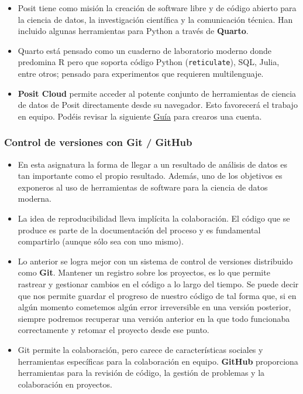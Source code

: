 \documentclass[
  letterpaper,
  DIV=11,
  numbers=noendperiod]{scrreprt}
\begin{document}
\begin{itemize}
\item
  Posit tiene como misión la creación de software libre y de código
  abierto para la ciencia de datos, la investigación científica y la
  comunicación técnica. Han incluido algunas herramientas para Python a
  través de \textbf{Quarto}.
\item
  Quarto está pensado como un cuaderno de laboratorio moderno donde
  predomina R pero que soporta código Python (\texttt{reticulate}), SQL,
  Julia, entre otros; pensado para experimentos que requieren
  multilenguaje.
\item
  \textbf{Posit Cloud} permite acceder al potente conjunto de
  herramientas de ciencia de datos de Posit directamente desde su
  navegador. Esto favorecerá el trabajo en equipo. Podéis revisar la
  siguiente \href{https://posit.cloud/learn/guide}{Guía} para crearos
  una cuenta.
\end{itemize}

\hypertarget{control-de-versiones-con-git-github}{%
\subsubsection{Control de versiones con Git /
GitHub}\label{control-de-versiones-con-git-github}}

\begin{itemize}
\item
  En esta asignatura la forma de llegar a un resultado de análisis de
  datos es tan importante como el propio resultado. Además, uno de los
  objetivos es exponeros al uso de herramientas de software para la
  ciencia de datos moderna.
\item
  La idea de reproducibilidad lleva implícita la colaboración. El código
  que se produce es parte de la documentación del proceso y es
  fundamental compartirlo (aunque sólo sea con uno mismo).
\item
  Lo anterior se logra mejor con un sistema de control de versiones
  distribuido como \textbf{Git}. Mantener un registro sobre los
  proyectos, es lo que permite rastrear y gestionar cambios en el código
  a lo largo del tiempo. Se puede decir que nos permite guardar el
  progreso de nuestro código de tal forma que, si en algún momento
  cometemos algún error irreversible en una versión posterior, siempre
  podremos recuperar una versión anterior en la que todo funcionaba
  correctamente y retomar el proyecto desde ese punto.
\item
  Git permite la colaboración, pero carece de características sociales y
  herramientas específicas para la colaboración en equipo.
  \textbf{GitHub} proporciona herramientas para la revisión de código,
  la gestión de problemas y la colaboración en proyectos.
\end{itemize}
\end{document}
